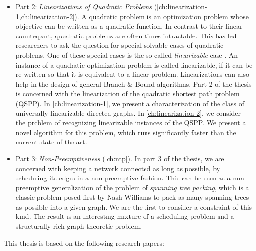\begin{itemize}
\item Part 2: \emph{Linearizations of Quadratic Problems}  (\cref{ch:linearization-1,ch:linearization-2}). 
A quadratic problem is an optimization problem whose objective can be written as a quadratic function. 
In contrast to their linear counterpart, quadratic problems are often times intractable. 
This has led researchers to ask the question for special solvable cases of quadratic problems. One of these special cases is the so-called \emph{linearizable} case \cite{bookhold1990contribution}. 
An instance of a quadratic optimization problem is called linearizable, if it can be re-written so that it is equivalent to a linear problem. Linearizations can also help in the design of general Branch \& Bound algorithms. Part 2 of the thesis is concerned with the linearization of the quadratic shortest path problem (QSPP). In \cref{ch:linearization-1}, we present a characterization of the class of universally linearizable directed graphs. In \cref{ch:linearization-2}, we consider the problem of recognizing linearizable instances of the QSPP. We present a novel algorithm for this problem, which runs significantly faster than the current state-of-the-art.

\item Part 3: \emph{Non-Preemptiveness} (\cref{ch:ntp}). In part 3 of the thesis, we are concerned with keeping a network connected as long as possible, by scheduling its edges in a non-preemptive fashion.
This can be seen as a non-preemptive generalization of the problem of \emph{spanning tree packing}, which is a classic problem posed first by Nash-Williams \cite{Nash-Williams1961} to pack as many spanning trees as possible into a given graph. We are the first to consider a constraint of this kind. The result is an interesting mixture of a scheduling problem and a structurally rich graph-theoretic problem.
\end{itemize}

This thesis is based on the following research papers:

